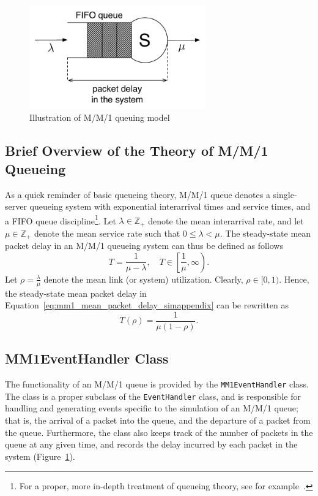 \begin{figure}[t]
	\includegraphics[width=3in]{Appendices/Figures/mm1_queue}
	\caption{Illustration of M/M/1 queuing model}
	\label{fig:mm1_queue_simappendix}
\end{figure}

\subsection{Brief Overview of the Theory of M/M/1 Queueing}
\label{sub:brief_overview_of_the_theory_of_mm1_queueing}
As a quick reminder of basic queueing theory, M/M/1 queue denotes a single-server queueing system with exponential interarrival times and service times, and a FIFO queue discipline\footnote{For a proper, more in-depth treatment of queueing theory, see for example~\cite{CassandrasLafortune2008}.}. Let $\lambda\in\mathbb{Z}_+$ denote the mean interarrival rate, and let $\mu\in\mathbb{Z}_+$ denote the mean service rate such that $0 \le \lambda < \mu$. The steady-state mean packet delay in an M/M/1 queueing system can thus be defined as follows
\begin{equation}
	\label{eq:mm1_mean_packet_delay_simappendix}
	T = \frac{1}{\mu - \lambda},\quad T\in\displaystyle\left[\frac{1}{\mu}, \infty\right).
\end{equation}
Let $\rho = \displaystyle\frac{\lambda}{\mu}$ denote the mean link (or system) utilization. Clearly, $\rho\in [0,1)$. Hence, the steady-state mean packet delay in Equation~\eqref{eq:mm1_mean_packet_delay_simappendix} can be rewritten as
\begin{equation}
	\label{eq:mm1_mean_packet_delay_2_simappendix}
	T(\rho) = \frac{1}{\mu(1 - \rho)}.
\end{equation}

\subsection{MM1EventHandler Class}
\label{sub:mm1eventhandler_class_simappendix}
The functionality of an M/M/1 queue is provided by the \lstinline{MM1EventHandler} class. The class is a proper subclass of the \lstinline{EventHandler} class, and is responsible for handling and generating events specific to the simulation of an M/M/1 queue; that is, the arrival of a packet into the queue, and the departure of a packet from the queue. Furthermore, the class also keeps track of the number of packets in the queue at any given time, and records the delay incurred by each packet in the system (Figure~\ref{fig:mm1_queue_simappendix}).

